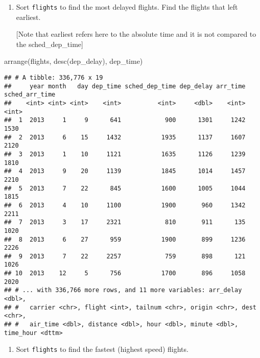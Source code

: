 \documentclass[
]{article}
\newenvironment{Shaded}{\begin{snugshade}}{\end{snugshade}}
\newcommand{\FunctionTok}[1]{\textcolor[rgb]{0.00,0.00,0.00}{#1}}
\newcommand{\NormalTok}[1]{#1}
\providecommand{\tightlist}{%
  \setlength{\itemsep}{0pt}\setlength{\parskip}{0pt}}
\begin{document}
\begin{enumerate}
\def\labelenumi{\arabic{enumi}.}
\setcounter{enumi}{1}
\item
  Sort \texttt{flights} to find the most delayed flights. Find the
  flights that left earliest.

  {[}Note that earliest refers here to the absolute time and it is not
  compared to the sched\_dep\_time{]}
\end{enumerate}

\begin{Shaded}
\begin{Highlighting}[]
\FunctionTok{arrange}\NormalTok{(flights, }\FunctionTok{desc}\NormalTok{(dep\_delay), dep\_time)}
\end{Highlighting}
\end{Shaded}

\begin{verbatim}
## # A tibble: 336,776 x 19
##     year month   day dep_time sched_dep_time dep_delay arr_time sched_arr_time
##    <int> <int> <int>    <int>          <int>     <dbl>    <int>          <int>
##  1  2013     1     9      641            900      1301     1242           1530
##  2  2013     6    15     1432           1935      1137     1607           2120
##  3  2013     1    10     1121           1635      1126     1239           1810
##  4  2013     9    20     1139           1845      1014     1457           2210
##  5  2013     7    22      845           1600      1005     1044           1815
##  6  2013     4    10     1100           1900       960     1342           2211
##  7  2013     3    17     2321            810       911      135           1020
##  8  2013     6    27      959           1900       899     1236           2226
##  9  2013     7    22     2257            759       898      121           1026
## 10  2013    12     5      756           1700       896     1058           2020
## # ... with 336,766 more rows, and 11 more variables: arr_delay <dbl>,
## #   carrier <chr>, flight <int>, tailnum <chr>, origin <chr>, dest <chr>,
## #   air_time <dbl>, distance <dbl>, hour <dbl>, minute <dbl>, time_hour <dttm>
\end{verbatim}

\begin{enumerate}
\def\labelenumi{\arabic{enumi}.}
\setcounter{enumi}{2}
\tightlist
\item
  Sort \texttt{flights} to find the fastest (highest speed) flights.
\end{enumerate}
\end{document}
